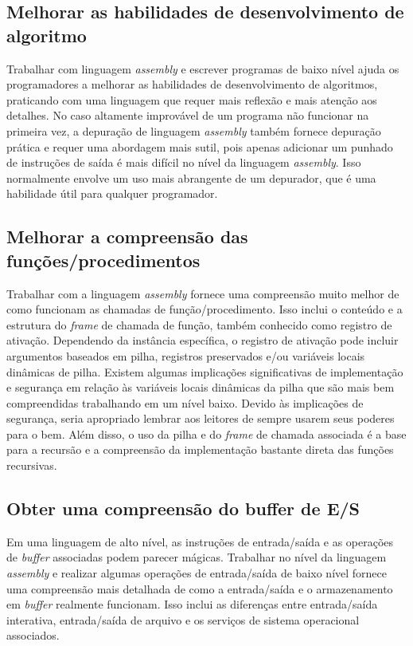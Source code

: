 \subsection{Melhorar as habilidades de desenvolvimento de algoritmo}
Trabalhar com linguagem \textit{assembly} e escrever programas de baixo nível ajuda os programadores a melhorar as habilidades de desenvolvimento de algoritmos, praticando com uma linguagem que requer mais reflexão e mais atenção aos detalhes. No caso altamente improvável de um programa não funcionar na primeira vez, a depuração de linguagem \textit{assembly} também fornece depuração prática e requer uma abordagem mais sutil, pois apenas adicionar um punhado de instruções de saída é mais difícil no nível da linguagem \textit{assembly}. Isso normalmente envolve um uso mais abrangente de um depurador, que é uma habilidade útil para qualquer programador.

\subsection{Melhorar a compreensão das funções/procedimentos}
Trabalhar com a linguagem \textit{assembly} fornece uma compreensão muito melhor de como funcionam as chamadas de função/procedimento. Isso inclui o conteúdo e a estrutura do \textit{frame} de chamada de função, também conhecido como registro de ativação. Dependendo da instância específica, o registro de ativação pode incluir argumentos baseados em pilha, registros preservados e/ou variáveis locais dinâmicas de pilha. Existem algumas implicações significativas de implementação e segurança em relação às variáveis locais dinâmicas da pilha que são mais bem compreendidas trabalhando em um nível baixo. Devido às implicações de segurança, seria apropriado lembrar aos leitores de sempre usarem seus poderes para o bem. Além disso, o uso da pilha e do \textit{frame} de chamada associada é a base para a recursão e a compreensão da implementação bastante direta das funções recursivas.

\subsection{Obter uma compreensão do buffer de E/S}
Em uma linguagem de alto nível, as instruções de entrada/saída e as operações de \textit{buffer} associadas podem parecer mágicas. Trabalhar no nível da linguagem \textit{assembly} e realizar algumas operações de entrada/saída de baixo nível fornece uma compreensão mais detalhada de como a entrada/saída e o armazenamento em \textit{buffer} realmente funcionam. Isso inclui as diferenças entre entrada/saída interativa, entrada/saída de arquivo e os serviços de sistema operacional associados.

